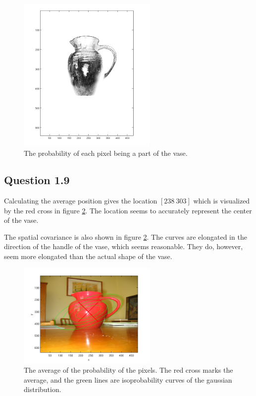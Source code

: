 \documentclass[a4paper, 10pt, final]{article}
\begin{document}
\begin{figure}[!htpb]
  \centering
  \includegraphics[width=0.6\textwidth]{images/kande1_probebility.png}
  \caption{The probability of each pixel being a part of the vase.}
  \label{fig:q1_8}
\end{figure}

\subsection*{Question 1.9}

Calculating the average position gives the location $[238~ 303]$ which is visualized by the red cross in figure \ref{fig:q1_9}.
The location seems to accurately represent the center of the vase.

The spatial covariance is also shown in figure \ref{fig:q1_9}.
The curves are elongated in the direction of the handle of the vase, which seems reasonable.
They do, however, seem more elongated than the actual shape of the vase.

\begin{figure}[!htpb]
  \centering
  \includegraphics[width=0.6\textwidth]{images/kande1.png}
  \caption{The average of the probability of the pixels. The red cross marks the average, and the green lines are isoprobability curves of the gaussian distribution.}
  \label{fig:q1_9}
\end{figure}
\end{document}
